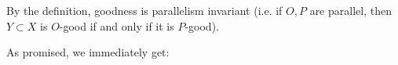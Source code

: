 \documentclass{amsart}
\theoremstyle{definition}
\newcommand{\acl}{\operatorname{acl}}
\begin{document}


By the definition, goodness is parallelism invariant (i.e. if $O,P$ are parallel, then $Y\subset X$ is $O$-good if and only if it is $P$-good).

As promised, we immediately get:
\end{document}
